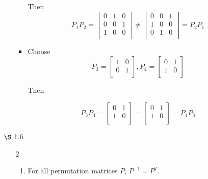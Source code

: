 \documentclass[12pt,letterpaper]{article}
\begin{document}
\begin{enumerate}
\begin{enumerate}
\begin{itemize}
              Then
              \[
                P_1 P_2
                =
                \begin{bmatrix}
                  0 & 1 & 0 \\
                  0 & 0 & 1 \\
                  1 & 0 & 0 \\
                \end{bmatrix}
                \ne
                \begin{bmatrix}
                  0 & 0 & 1 \\
                  1 & 0 & 0 \\
                  0 & 1 & 0 \\
                \end{bmatrix}
                =
                P_2 P_1
              \]
            \item
              Choose
              \[
                P_3
                =
                \begin{bmatrix}
                  1 & 0 \\
                  0 & 1 \\
                \end{bmatrix}
                ,
                P_4
                =
                \begin{bmatrix}
                  0 & 1 \\
                  1 & 0 \\
                \end{bmatrix}
              \]

              Then

              \[
                P_3 P_4
                =
                \begin{bmatrix}
                  0 & 1 \\
                  1 & 0 \\
                \end{bmatrix}
                =
                \begin{bmatrix}
                  0 & 1 \\
                  1 & 0 \\
                \end{bmatrix}
                =
                P_4 P_3
              \]
          \end{itemize}
      \end{enumerate}
    \item [$\S$ 1.6]
      \begin{enumerate}
        \item [2]
          \begin{enumerate}
            \item For all permutation matrices $P$, $P^{-1} = P^T$.


\end{enumerate}
\end{enumerate}
\end{enumerate}
\end{document}
